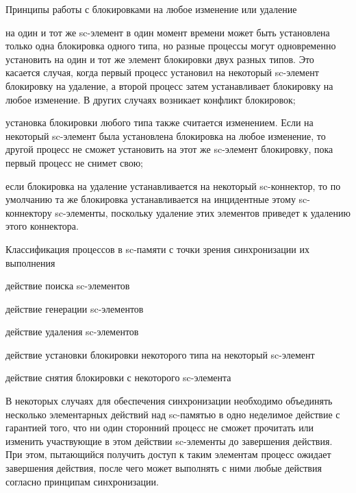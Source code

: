 \begin{frame}{\large Принципы работы с блокировками на любое изменение или удаление}
\vspace{18}
    \begin{textitemize}
	\item на один и тот же sc-элемент в один момент времени может быть установлена только одна блокировка одного типа, но разные процессы могут одновременно установить на один и тот же элемент блокировки двух разных типов. Это касается случая, когда первый процесс установил на некоторый sc-элемент блокировку на удаление, а второй процесс затем устанавливает блокировку на любое изменение. В других случаях возникает конфликт блокировок;
	\item установка блокировки любого типа также считается изменением. Если на некоторый \mbox{sc-элемент} была установлена блокировка на любое изменение, то другой процесс не сможет установить на этот же sc-элемент блокировку, пока первый процесс не снимет свою;
	\item если блокировка на удаление устанавливается на некоторый sc-коннектор, то по умолчанию та же блокировка устанавливается на инцидентные этому sc-коннектору sc-элементы, поскольку удаление этих элементов приведет к удалению этого коннектора.
\end{textitemize}
\end{frame}

\begin{frame}{\large Классификация процессов в sc-памяти с точки зрения синхронизации их выполнения}
\vspace{15}
\begin{textitemize}
    \item{действие поиска sc-элементов}
	\item{действие генерации sc-элементов}
	\item{действие удаления sc-элементов}
	\item{действие установки блокировки некоторого типа на некоторый sc-элемент}
	\item{действие снятия блокировки с некоторого sc-элемента}
 \end{textitemize}
 В некоторых случаях для обеспечения синхронизации необходимо объединять несколько элементарных действий над sc-памятью в одно неделимое действие с гарантией того, что ни один сторонний процесс не сможет прочитать или изменить участвующие в этом действии sc-элементы до завершения действия. При этом, пытающийся получить доступ к таким элементам процесс ожидает завершения действия, после чего может выполнять с ними любые действия согласно принципам синхронизации.
\end{frame}

